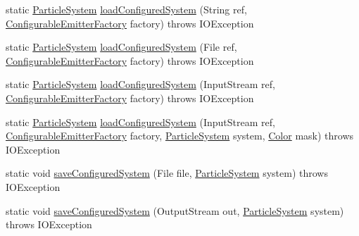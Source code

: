 \begin{DoxyCompactItemize}
static \mbox{\hyperlink{classorg_1_1newdawn_1_1slick_1_1particles_1_1_particle_system}{Particle\+System}} \mbox{\hyperlink{classorg_1_1newdawn_1_1slick_1_1particles_1_1_particle_i_o_af28eccfb00d09019bf3b14c7f96bd702}{load\+Configured\+System}} (String ref, \mbox{\hyperlink{interfaceorg_1_1newdawn_1_1slick_1_1particles_1_1_configurable_emitter_factory}{Configurable\+Emitter\+Factory}} factory)  throws I\+O\+Exception 
\item 
static \mbox{\hyperlink{classorg_1_1newdawn_1_1slick_1_1particles_1_1_particle_system}{Particle\+System}} \mbox{\hyperlink{classorg_1_1newdawn_1_1slick_1_1particles_1_1_particle_i_o_a9a2fae7cc5f4a60763c9f223fad8d0ab}{load\+Configured\+System}} (File ref, \mbox{\hyperlink{interfaceorg_1_1newdawn_1_1slick_1_1particles_1_1_configurable_emitter_factory}{Configurable\+Emitter\+Factory}} factory)  throws I\+O\+Exception 
\item 
static \mbox{\hyperlink{classorg_1_1newdawn_1_1slick_1_1particles_1_1_particle_system}{Particle\+System}} \mbox{\hyperlink{classorg_1_1newdawn_1_1slick_1_1particles_1_1_particle_i_o_ac80838fce5476faff35b22c95727f63a}{load\+Configured\+System}} (Input\+Stream ref, \mbox{\hyperlink{interfaceorg_1_1newdawn_1_1slick_1_1particles_1_1_configurable_emitter_factory}{Configurable\+Emitter\+Factory}} factory)  throws I\+O\+Exception 
\item 
static \mbox{\hyperlink{classorg_1_1newdawn_1_1slick_1_1particles_1_1_particle_system}{Particle\+System}} \mbox{\hyperlink{classorg_1_1newdawn_1_1slick_1_1particles_1_1_particle_i_o_a4731a702feaf10afe51285980453aa2a}{load\+Configured\+System}} (Input\+Stream ref, \mbox{\hyperlink{interfaceorg_1_1newdawn_1_1slick_1_1particles_1_1_configurable_emitter_factory}{Configurable\+Emitter\+Factory}} factory, \mbox{\hyperlink{classorg_1_1newdawn_1_1slick_1_1particles_1_1_particle_system}{Particle\+System}} system, \mbox{\hyperlink{classorg_1_1newdawn_1_1slick_1_1_color}{Color}} mask)  throws I\+O\+Exception 
\item 
static void \mbox{\hyperlink{classorg_1_1newdawn_1_1slick_1_1particles_1_1_particle_i_o_a064f618a541d57771f9ce35d558763a1}{save\+Configured\+System}} (File file, \mbox{\hyperlink{classorg_1_1newdawn_1_1slick_1_1particles_1_1_particle_system}{Particle\+System}} system)  throws I\+O\+Exception 
\item 
static void \mbox{\hyperlink{classorg_1_1newdawn_1_1slick_1_1particles_1_1_particle_i_o_a20968832144b21a7ae3d390dac4f5406}{save\+Configured\+System}} (Output\+Stream out, \mbox{\hyperlink{classorg_1_1newdawn_1_1slick_1_1particles_1_1_particle_system}{Particle\+System}} system)  throws I\+O\+Exception 

\end{DoxyCompactItemize}
